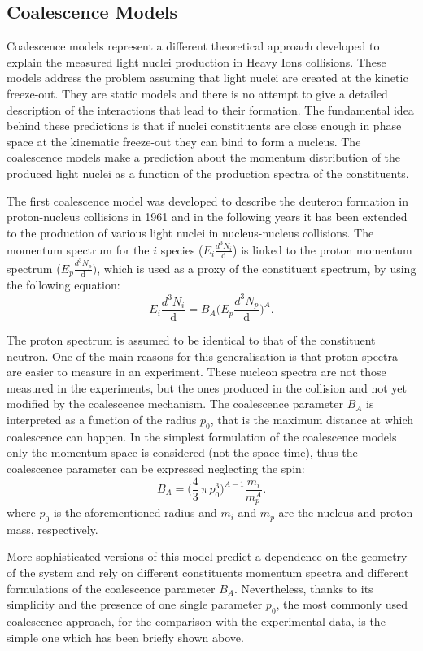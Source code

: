 %
\subsection{Coalescence Models} \label{sec:1.4.2}

Coalescence models represent a different theoretical approach developed to explain 
the measured light nuclei production in Heavy Ions collisions. 
These models address the problem assuming that light nuclei are created at the kinetic freeze-out. 
They are static models and there is no attempt to give a detailed description of the 
interactions that lead to their formation.
The fundamental idea behind these predictions is that if nuclei constituents are close enough in 
phase space at the kinematic freeze-out they can bind to form a nucleus. 
The coalescence models make a prediction about the momentum distribution of the produced light 
nuclei as a function of the production spectra of the constituents.

The first coalescence model was developed to describe the deuteron formation in
proton-nucleus collisions in 1961 \cite{coalefirst} and in the following years it has been extended to 
the production of various light nuclei in nucleus-nucleus collisions.
The momentum spectrum for the $i$ species ($E_{i} \frac{d^{3}N_{i}}{\mathop{dp_{i}^{3}}}$) is linked to 
the proton momentum spectrum ($E_{p} \frac{d^{3}N_{p}}{\mathop{dp_{p}^{3}}})$, which is used as a 
proxy of the constituent spectrum, by using the following equation:
\begin{equation}
    E_{i} \frac{d^{3}N_{i}}{\mathop{dp_{i}^{3}}} = B_{A} \Big( E_{p} \frac{d^{3}N_{p}}{\mathop{dp_{p}^{3}}} \Big)^{A}.
\end{equation}

The proton spectrum  is assumed to be identical to that of the constituent neutron.
One of the main reasons for this generalisation is that proton spectra are easier to measure
in an experiment.
These nucleon spectra are not those measured in the experiments, but the ones produced in the 
collision and not yet modified by the coalescence mechanism.
The coalescence parameter $B_{A}$ is interpreted as a function of the radius $p_{0}$, that 
is the maximum distance at which coalescence can happen.
In the simplest formulation of the coalescence models only the momentum space is considered
(not the space-time), thus the coalescence parameter can be expressed neglecting the spin:
\begin{equation} 
    B_{A} = \Big( \frac{4}{3}\, \pi \,p_{0}^3 \Big)^{A-1} \frac{m_{i}}{m_{p}^{A}}.
\end{equation}
where $p_{0}$ is the aforementioned radius and $m_{i}$ and $m_{p}$ are the nucleus and proton
mass, respectively.

More sophisticated versions of this model \cite{deuprod} predict a dependence on the geometry of the
system and rely on different constituents momentum spectra and different formulations of 
the coalescence parameter $B_{A}$. Nevertheless, thanks to its simplicity and the presence
of one single parameter $p_{0}$, the most commonly used coalescence approach, for the comparison with
the experimental data, is the simple one which has been briefly shown above.
